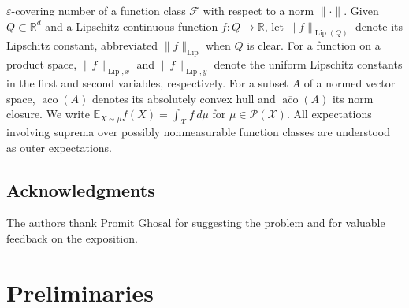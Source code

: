 \documentclass[11pt]{amsart}
\theoremstyle{definition}
\theoremstyle{remark}
\newcommand{\R}{\mathbb{R}}
\newcommand{\E}{\mathbb{E}}
\newcommand{\1}{\mathbf{1}}
\newcommand{\Lip}{\operatorname{Lip}}
\numberwithin{equation}{section}
\begin{document}
$\varepsilon$-covering number of a function class $\mathcal{F}$ with respect
to a norm $\|\cdot\|$. Given $Q \subset \R^d$ and a Lipschitz continuous
function $f:Q\to\R$, let $\|f\|_{\Lip(Q)}$ denote its Lipschitz
constant, abbreviated $\|f\|_{\Lip}$ when $Q$ is clear. For a function on a product space, $\|f\|_{\Lip,x}$ and $\|f\|_{\Lip,y}$ denote the uniform Lipschitz constants in the first and second variables, respectively. For a subset $A$ of a normed vector space, $\operatorname{aco}(A)$ denotes its absolutely convex hull and $\overline{\operatorname{aco}}(A)$ its norm closure. We write $\E_{X\sim \mu} f(X) = \int_\mathcal{X} f\,d\mu$ for $\mu \in \mathcal{P}(\mathcal{X})$. All expectations involving suprema over possibly nonmeasurable function classes are understood as outer expectations.

\subsection{Acknowledgments}
The authors thank Promit Ghosal for suggesting the problem and for valuable feedback on the exposition.
\section{Preliminaries} \label{sec:preliminaries}
\end{document}
